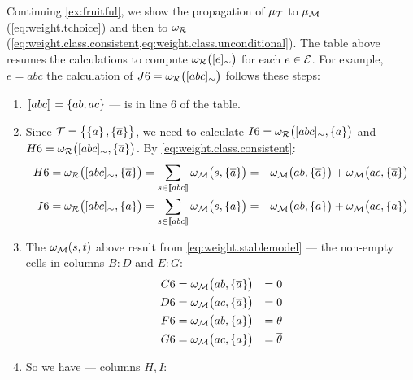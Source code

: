 \documentclass[x11names]{tlp}
\begin{document}
\begin{example}
		Continuing \cref{ex:fruitful}, we show the propagation of $\mu_{{\mathcal{T}}}$ to $\mu_{{\mathcal{M}}}$
		(\cref{eq:weight.tchoice}) and then to $\omega_{{\mathcal{R}}}$
		(\cref{eq:weight.class.consistent,eq:weight.class.unconditional}).
The
		table above resumes the calculations to compute $\wgtc{\class{e}}$ for each $e
			\in {\mathcal{E}}$.
For example, $e = abc$ the calculation of $J6 =
			\wgtc{\class{abc}}$ follows these steps:
		\begin{enumerate}
			\item $\left\llbracket abc \right\rrbracket = \set{ab,ac}$ --- is in line $6$ of the table.
			\item Since ${\mathcal{T}} = \set{\set{a}, \set{\ensuremath{\overline{a}}}}$, we need to calculate $I6 =
				      \wgtc{\class{abc}, \set{a}}$ and $H6 = \wgtc{\class{abc}, \set{\co{a}}}$.
By
			      \cref{eq:weight.class.consistent}:
			      \begin{equation*}
				      \begin{aligned}
					      H6 = \wgtc{\class{abc}, \set{\co{a}}}
					       & = \sum_{s \in \stablecore{abc}} \wgtm{s, \set{\co{a}}}
					      =
					       & \wgtm{ab, \set{\co{a}}} +  \wgtm{ac, \set{\co{a}}}      %
					      \\
					      I6 = \wgtc{\class{abc}, \set{a}}
					       & = \sum_{s \in \stablecore{abc}} \wgtm{s, \set{a}}
					      =
					       & \wgtm{ab, \set{a}} +  \wgtm{ac, \set{a}}
				      \end{aligned}
			      \end{equation*}
			\item The $\wgtm{s,t}$ above result from \cref{eq:weight.stablemodel} --- the
			      non-empty cells in columns $B:D$ and $E:G$:
			      \begin{equation*}
				      \begin{aligned}
					      C6
					       & = \wgtm{ab, \set{\co{a}}}
					       & = 0                      %
					      \\
					      D6
					       & = \wgtm{ac, \set{\co{a}}}
					       & = 0                      %
					      \\
					      F6
					       & = \wgtm{ab, \set{a}}
					       & = \theta                 %
					      \\
					      G6
					       & = \wgtm{ac, \set{a}}
					       & = \co{\theta}
				      \end{aligned}
			      \end{equation*}
			\item So we have --- columns $H, I$:
			      \begin{equation*}

\end{equation*}
\end{enumerate}
\end{example}
\end{document}
